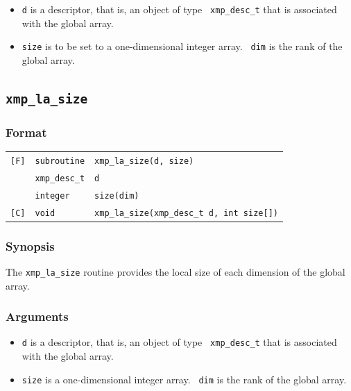 \begin{itemize}
 \item {\tt d} is a descriptor, that is, an object of type {\tt
       xmp\_desc\_t} that is associated with the global array.
 \item {\tt size} is to be set to a one-dimensional integer array. {\tt
       dim} is the rank of the global array.
\end{itemize}

\subsection{\tt xmp\_la\_size}

\subsubsection*{Format}

\begin{tabular}{lll}

\verb![F]!& {\tt subroutine}& {\tt xmp\_la\_size(d, size)}\\
          & {\tt xmp\_desc\_t} & {\tt d}\\
          & {\tt integer} & {\tt size(dim)}\\

\verb![C]!&  {\tt void}& {\tt xmp\_la\_size(xmp\_desc\_t d, int size[])}\\

\end{tabular}

\subsubsection*{Synopsis}

The {\tt xmp\_la\_size} routine provides the local size of each
dimension of the global array.

\subsubsection*{Arguments}

\begin{itemize}
 \item {\tt d} is a descriptor, that is, an object of type {\tt
       xmp\_desc\_t} that is associated with the global array.
 \item {\tt size} is a one-dimensional integer array. {\tt
       dim} is the rank of the global array.
\end{itemize}

